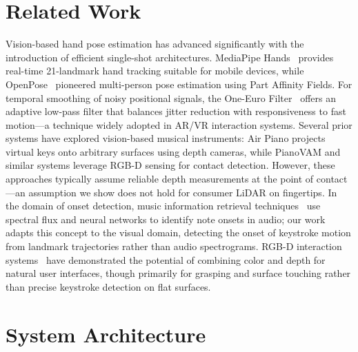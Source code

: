 \documentclass[11pt,a4paper]{article}
\begin{document}
\section{Related Work}

Vision-based hand pose estimation has advanced significantly with the introduction of efficient single-shot architectures.
MediaPipe Hands~\cite{zhang2020mediapipe} provides real-time 21-landmark hand tracking suitable for mobile devices, while OpenPose~\cite{cao2019openpose} pioneered multi-person pose estimation using Part Affinity Fields.
For temporal smoothing of noisy positional signals, the One-Euro Filter~\cite{casiez2012oneeuro} offers an adaptive low-pass filter that balances jitter reduction with responsiveness to fast motion---a technique widely adopted in AR/VR interaction systems.
Several prior systems have explored vision-based musical instruments: Air Piano projects virtual keys onto arbitrary surfaces using depth cameras, while PianoVAM and similar systems leverage RGB-D sensing for contact detection.
However, these approaches typically assume reliable depth measurements at the point of contact---an assumption we show does not hold for consumer LiDAR on fingertips.
In the domain of onset detection, music information retrieval techniques~\cite{bock2012onset} use spectral flux and neural networks to identify note onsets in audio; our work adapts this concept to the visual domain, detecting the onset of keystroke motion from landmark trajectories rather than audio spectrograms.
RGB-D interaction systems~\cite{hilliges2012holodesk} have demonstrated the potential of combining color and depth for natural user interfaces, though primarily for grasping and surface touching rather than precise keystroke detection on flat surfaces.

\section{System Architecture}
\end{document}
